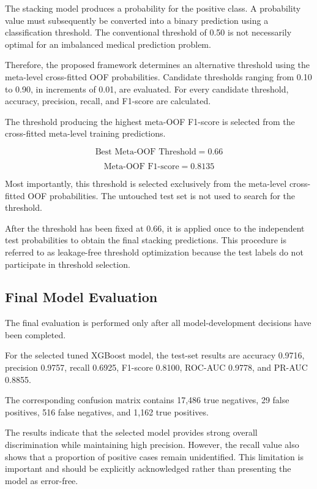 \documentclass[conference]{IEEEtran}
\begin{document}
The stacking model produces a probability for the positive class. A probability value must subsequently be converted into a binary prediction using a classification threshold. The conventional threshold of 0.50 is not necessarily optimal for an imbalanced medical prediction problem.

Therefore, the proposed framework determines an alternative threshold using the meta-level cross-fitted OOF probabilities. Candidate thresholds ranging from 0.10 to 0.90, in increments of 0.01, are evaluated. For every candidate threshold, accuracy, precision, recall, and F1-score are calculated.

The threshold producing the highest meta-OOF F1-score is selected from the cross-fitted meta-level training predictions.

\begin{equation}
\text{Best Meta-OOF Threshold} = 0.66
\end{equation}

\begin{equation}
\text{Meta-OOF F1-score} = 0.8135
\end{equation}

Most importantly, this threshold is selected exclusively from the meta-level cross-fitted OOF probabilities. The untouched test set is not used to search for the threshold.

After the threshold has been fixed at 0.66, it is applied once to the independent test probabilities to obtain the final stacking predictions. This procedure is referred to as leakage-free threshold optimization because the test labels do not participate in threshold selection.

\subsection{Final Model Evaluation}

The final evaluation is performed only after all model-development decisions have been completed.

For the selected tuned XGBoost model, the test-set results are accuracy 0.9716, precision 0.9757, recall 0.6925, F1-score 0.8100, ROC-AUC 0.9778, and PR-AUC 0.8855.

The corresponding confusion matrix contains 17,486 true negatives, 29 false positives, 516 false negatives, and 1,162 true positives.

The results indicate that the selected model provides strong overall discrimination while maintaining high precision. However, the recall value also shows that a proportion of positive cases remain unidentified. This limitation is important and should be explicitly acknowledged rather than presenting the model as error-free.
\end{document}
